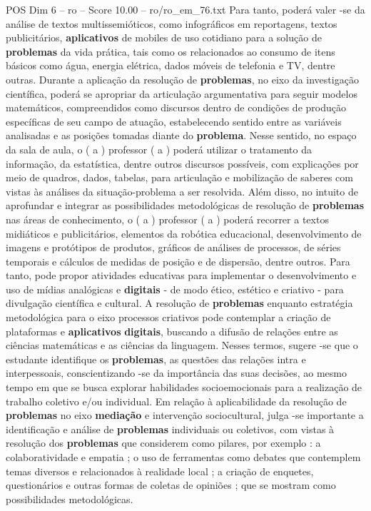 \begin{textsample}{POS Dim 6 – ro – Score 10.00 – ro/ro\_em\_76.txt}
Para tanto, poderá valer -se da análise de textos multissemióticos, como infográficos em reportagens, textos publicitários, \textbf{aplicativos} de mobiles de uso cotidiano para a solução de \textbf{problemas} da vida prática, tais como os relacionados ao consumo de itens básicos como água, energia elétrica, dados móveis de telefonia e TV, dentre outras.
Durante a aplicação da resolução de \textbf{problemas}, no eixo da investigação científica, poderá se apropriar da articulação argumentativa para seguir modelos matemáticos, compreendidos como discursos dentro de condições de produção específicas de seu campo de atuação, estabelecendo sentido entre as variáveis analisadas e as posições tomadas diante do \textbf{problema}.
Nesse sentido, no espaço da sala de aula, o ( a ) professor ( a ) poderá utilizar o tratamento da informação, da estatística, dentre outros discursos possíveis, com explicações por meio de quadros, dados, tabelas, para articulação e mobilização de saberes com vistas às análises da situação-problema a ser resolvida.
Além disso, no intuito de aprofundar e integrar as possibilidades metodológicas de resolução de \textbf{problemas} nas áreas de conhecimento, o ( a ) professor ( a ) poderá recorrer a textos midiáticos e publicitários, elementos da robótica educacional, desenvolvimento de imagens e protótipos de produtos, gráficos de análises de processos, de séries temporais e cálculos de medidas de posição e de dispersão, dentre outros.
Para tanto, pode propor atividades educativas para implementar o desenvolvimento e uso de mídias analógicas e \textbf{digitais} - de modo ético, estético e criativo - para divulgação científica e cultural.
A resolução de \textbf{problemas} enquanto estratégia metodológica para o eixo processos criativos pode contemplar a criação de plataformas e \textbf{aplicativos} \textbf{digitais}, buscando a difusão de relações entre as ciências matemáticas e as ciências da linguagem.
Nesses termos, sugere -se que o estudante identifique os \textbf{problemas}, as questões das relações intra e interpessoais, conscientizando -se da importância das suas decisões, ao mesmo tempo em que se busca explorar habilidades socioemocionais para a realização de trabalho coletivo e/ou individual.
Em relação à aplicabilidade da resolução de \textbf{problemas} no eixo \textbf{mediação} e intervenção sociocultural, julga -se importante a identificação e análise de \textbf{problemas} individuais ou coletivos, com vistas à resolução dos \textbf{problemas} que considerem como pilares, por exemplo : a colaboratividade e empatia ; o uso de ferramentas como debates que contemplem temas diversos e relacionados à realidade local ; a criação de enquetes, questionários e outras formas de coletas de opiniões ; que se mostram como possibilidades metodológicas.

\end{textsample}
